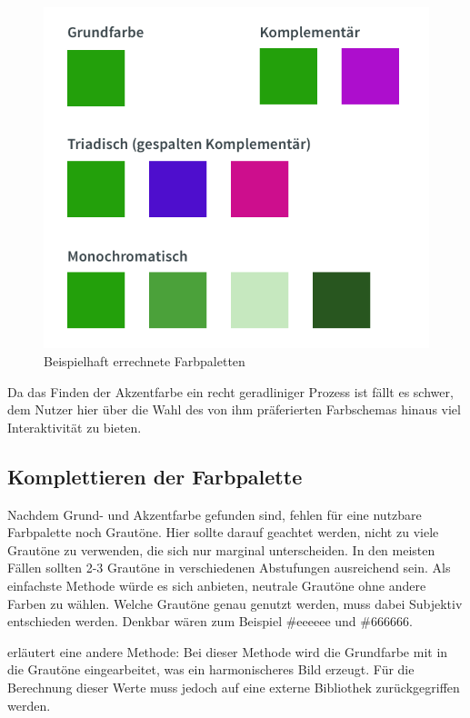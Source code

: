 \begin{figure}[h]
    \centering
    \includegraphics[width=1\textwidth]{images/color-schemes.png}
    \caption{Beispielhaft errechnete Farbpaletten}
    \label{fig:color-schemes}
\end{figure}

Da das Finden der Akzentfarbe ein recht geradliniger Prozess ist fällt es schwer, dem Nutzer hier über die Wahl des von ihm präferierten Farbschemas hinaus viel Interaktivität zu bieten.

\subsection{Komplettieren der Farbpalette}

Nachdem Grund- und Akzentfarbe gefunden sind, fehlen für eine nutzbare Farbpalette noch Grautöne.  Hier sollte darauf geachtet werden, nicht zu viele Grautöne zu verwenden, die sich nur marginal unterscheiden. In den meisten Fällen sollten 2-3 Grautöne in verschiedenen Abstufungen ausreichend sein.
Als einfachste Methode würde es sich anbieten, neutrale Grautöne ohne andere Farben zu wählen. Welche Grautöne genau genutzt werden, muss dabei Subjektiv entschieden werden. Denkbar wären zum Beispiel \#eeeeee und \#666666.

\cite{elizabeth2016simple} erläutert eine andere Methode: Bei dieser Methode wird die Grundfarbe mit in die Grautöne eingearbeitet, was ein harmonischeres Bild erzeugt.  Für die Berechnung dieser Werte muss jedoch auf eine externe Bibliothek zurückgegriffen werden.

